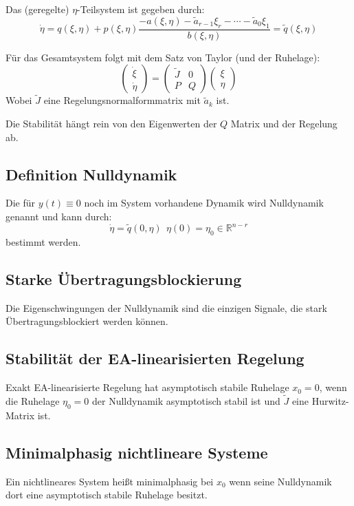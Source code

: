 Das (geregelte) $\eta$-Teilsystem ist gegeben durch:
\begin{equation}
    \dot{\eta} = q(\xi, \eta) + p(\xi, \eta) 
    \frac{-a(\xi, \eta) - \tilde{a}_{r-1} \xi_r - \cdots - \tilde{a}_0 \xi_1}{b(\xi, \eta)}
    = \tilde{q}(\xi, \eta)
\end{equation}

Für das Gesamtsystem folgt mit dem Satz von Taylor (und der Ruhelage):
\begin{equation}
    \begin{pmatrix} \dot{\xi} \\ \dot{\eta} \end{pmatrix} =
    \begin{pmatrix} \tilde{J} & 0 \\ P & Q \end{pmatrix}
    \begin{pmatrix} \xi \\ \eta \end{pmatrix}
\end{equation}
Wobei $\tilde{J}$ eine Regelungsnormalformmatrix mit $\tilde{a}_k$ ist.

Die Stabilität hängt rein von den Eigenwerten der $Q$ Matrix und der Regelung ab.

\subsection{Definition Nulldynamik}
Die für $y(t) \equiv 0$ noch im System vorhandene Dynamik wird Nulldynamik genannt
und kann durch:
\begin{equation}
    \dot{\eta} = \tilde{q}(0, \eta)\ \ \eta(0) = \eta_0 \in \mathbb{R}^{n-r}
\end{equation}
bestimmt werden.

\subsection{Starke Übertragungsblockierung}
Die Eigenschwingungen der Nulldynamik sind die einzigen Signale, die stark Übertragungsblockiert werden können.

\subsection{Stabilität der EA-linearisierten Regelung}
Exakt EA-linearisierte Regelung hat asymptotisch stabile Ruhelage $x_0 = 0$, wenn die
Ruhelage $\eta_0 = 0$ der Nulldynamik asymptotisch stabil ist und $\tilde{J}$ eine Hurwitz-Matrix
ist.

\subsection{Minimalphasig nichtlineare Systeme}
Ein nichtlineares System heißt minimalphasig bei $x_0$ wenn seine Nulldynamik dort eine
asymptotisch stabile Ruhelage besitzt.
